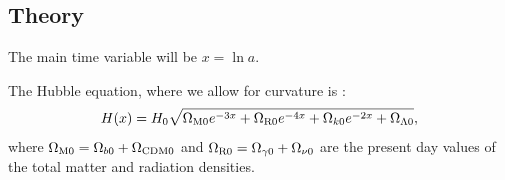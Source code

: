 \subsection{Theory}\label{sec:m1:theory}

The main time variable will be $x=\ln a$. 

The Hubble equation, where we allow for curvature is :
\begin{equation}\label{eq:m1:hubble_equation}
    \begin{split}
        H(x) = H_0\sqrt{\Omega_\mathrm{M0}e^{-3x} + \Omega_\mathrm{R0}e^{-4x} + \Omega_{k0}e^{-2x} + \Omega_{\Lambda 0}},
    \end{split}
\end{equation}
where $\Omega_\mathrm{M0} = \Omega_{b0} + {\Omega_{\text{CDM}0}}$ and $\Omega_{\mathrm{R}0} = \Omega_{\gamma 0} + \Omega_{\nu 0}$ are the present day values of the total matter and radiation densities. 